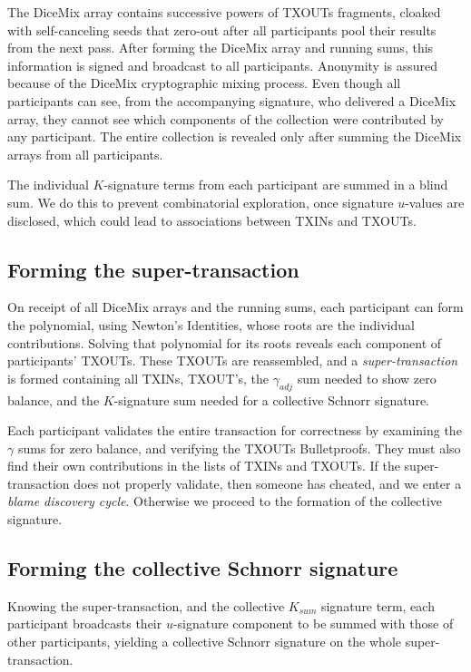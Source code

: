 \documentclass[8pt,fleqn,openany]{book}
\begin{document}
The DiceMix array contains successive powers of TXOUTs fragments, cloaked with self-canceling seeds that zero-out after all participants pool their results from the next pass. After forming the DiceMix array and running sums, this information is signed and broadcast to all participants. Anonymity is assured because of the DiceMix cryptographic mixing process. Even though all participants can see, from the accompanying signature, who delivered a DiceMix array, they cannot see which components of the collection were contributed by any participant. The entire collection is revealed only after summing the DiceMix arrays from all participants.

The individual $K$-signature terms from each participant are summed in a blind sum. We do this to prevent combinatorial exploration, once signature $u$-values are disclosed, which could lead to associations between TXINs and TXOUTs.

\subsection{Forming the super-transaction} 
On receipt of all DiceMix arrays and the running sums, each participant can form the polynomial, using Newton’s Identities, whose roots are the individual contributions. Solving that polynomial for its roots reveals each component of participants’ TXOUTs. These TXOUTs are reassembled, and a \textit{super-transaction} is formed containing all TXINs, TXOUT’s, the $\gamma_{adj}$ sum needed to show zero balance, and the $K$-signature sum needed for a collective Schnorr signature.

Each participant validates the entire transaction for correctness by examining the $\gamma$ sums for zero balance, and verifying the TXOUTs Bulletproofs. They must also find their own contributions in the lists of TXINs and TXOUTs. If the super-transaction does not properly validate, then someone has cheated, and we enter a \textit{blame discovery cycle}. Otherwise we proceed to the formation of the collective signature. 

\subsection{Forming the collective Schnorr signature} 
Knowing the super-transaction, and the collective $K_{sum}$ signature term, each participant broadcasts their $u$-signature component to be summed with those of other participants, yielding a collective Schnorr signature on the whole super-transaction.
\end{document}
